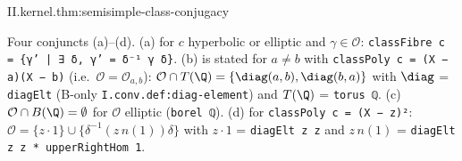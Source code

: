 \begin{theorem}
\end{theorem}
\begin{tfformal}{II.kernel.thm:semisimple-class-conjugacy}
\begin{tffidelity}
Four conjuncts (a)--(d). (a) for $c$ hyperbolic or elliptic and $\gamma\in\mathcal O$: \texttt{classFibre c = \{γ' | ∃ δ, γ' = δ⁻¹ γ δ\}}. (b) is stated for $a\ne b$ with \texttt{classPoly c = (X − a)(X − b)} (i.e.\ $\mathcal O=\mathcal O_{a,b}$): $\mathcal O\cap T(\Q)=\{\diag(a,b),\diag(b,a)\}$ with $\diag$ = \texttt{diagElt} (B-only \texttt{I.conv.def:diag-element}) and $T(\Q)$ = \texttt{torus ℚ}. (c) $\mathcal O\cap B(\Q)=\emptyset$ for $\mathcal O$ elliptic (\texttt{borel ℚ}). (d) for \texttt{classPoly c = (X − z)²}: $\mathcal O=\{z\cdot1\}\cup\{\delta^{-1}(z\,n(1))\delta\}$ with $z\cdot1$ = \texttt{diagElt z z} and $z\,n(1)$ = \texttt{diagElt z z * upperRightHom 1}.
\end{tffidelity}
\end{tfformal}
